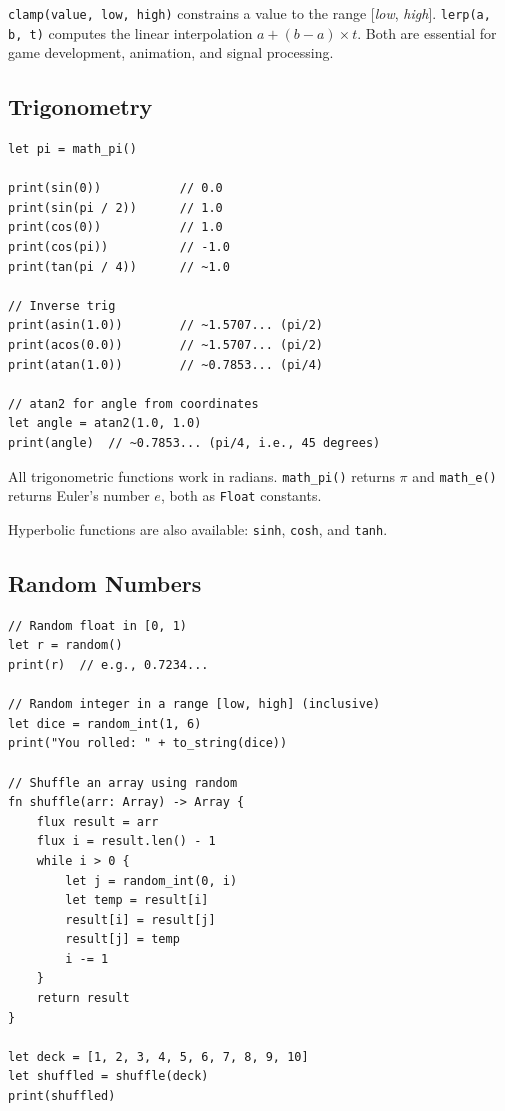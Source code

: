 \lstinline|clamp(value, low, high)| constrains a value to the range
[\textit{low}, \textit{high}]. \lstinline|lerp(a, b, t)| computes the
linear interpolation $a + (b - a) \times t$. Both are essential for game
development, animation, and signal processing.

\subsection{Trigonometry}\label{sec:math-trig}

\begin{lstlisting}[language=Lattice, caption={Trigonometric functions}]
let pi = math_pi()

print(sin(0))           // 0.0
print(sin(pi / 2))      // 1.0
print(cos(0))           // 1.0
print(cos(pi))          // -1.0
print(tan(pi / 4))      // ~1.0

// Inverse trig
print(asin(1.0))        // ~1.5707... (pi/2)
print(acos(0.0))        // ~1.5707... (pi/2)
print(atan(1.0))        // ~0.7853... (pi/4)

// atan2 for angle from coordinates
let angle = atan2(1.0, 1.0)
print(angle)  // ~0.7853... (pi/4, i.e., 45 degrees)
\end{lstlisting}

All trigonometric functions work in radians. \lstinline|math_pi()| returns
$\pi$ and \lstinline|math_e()| returns Euler's number $e$, both as
\lstinline|Float| constants.

Hyperbolic functions are also available: \lstinline|sinh|, \lstinline|cosh|,
and \lstinline|tanh|.

\subsection{Random Numbers}\label{sec:math-random}

\begin{lstlisting}[language=Lattice, caption={Generating random numbers}]
// Random float in [0, 1)
let r = random()
print(r)  // e.g., 0.7234...

// Random integer in a range [low, high] (inclusive)
let dice = random_int(1, 6)
print("You rolled: " + to_string(dice))

// Shuffle an array using random
fn shuffle(arr: Array) -> Array {
    flux result = arr
    flux i = result.len() - 1
    while i > 0 {
        let j = random_int(0, i)
        let temp = result[i]
        result[i] = result[j]
        result[j] = temp
        i -= 1
    }
    return result
}

let deck = [1, 2, 3, 4, 5, 6, 7, 8, 9, 10]
let shuffled = shuffle(deck)
print(shuffled)
\end{lstlisting}

